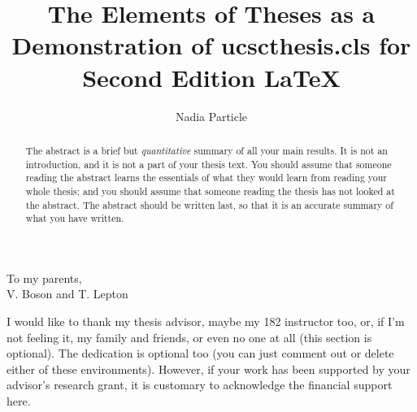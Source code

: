 \documentclass[11pt]{ucscthesisbs}
\begin{document}

\title{The Elements of Theses as a Demonstration of ucscthesis.cls for 
Second Edition \LaTeX}
\author{Nadia Particle}
%
%



\maketitle
\copyrightpage

\begin{frontmatter}

\begin{abstract}
The abstract is a brief but {\it quantitative} summary of all your main results.  It is not an introduction, and it is not a part of your thesis text.  You should assume that someone reading the abstract learns the essentials of what they would learn from reading your whole thesis; and you should assume that someone reading the thesis has not looked at the abstract.  The abstract should be written last, so that it is an accurate summary of what you have written.
\end{abstract}

\tableofcontents
%
%
\listoffigures
\listoftables

\begin{dedication}
\null\vfil
{\large
\begin{center}
To my parents,\\\vspace{12pt}
V. Boson and T. Lepton
\end{center}}
\vfil\null
\end{dedication}

\begin{acknowledgements}
I would like to thank my thesis advisor, maybe my 182 instructor too, or, if I'm not feeling it, my family and friends, or even no one at all (this section is optional).  The dedication is optional too (you can just comment out or delete either of these environments).  However, if your work has been supported by your advisor's research grant, it is customary to acknowledge the financial support here.
\end{acknowledgements}


\end{frontmatter}
\end{document}
